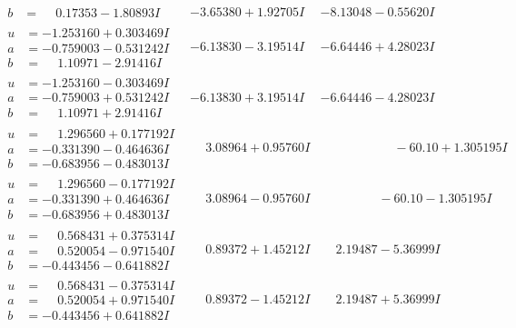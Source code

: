 \documentclass[1p]{elsarticle_modified}
\theoremstyle{definition}
\begin{document}
$$\begin{array}{c|c|c}
\begin{aligned}
b &= \phantom{-}0.17353 - 1.80893 I\end{aligned}
 & -3.65380 + 1.92705 I & -8.13048 - 0.55620 I \\ \hline\begin{aligned}
u &= -1.253160 + 0.303469 I \\
a &= -0.759003 - 0.531242 I \\
b &= \phantom{-}1.10971 - 2.91416 I\end{aligned}
 & -6.13830 - 3.19514 I & -6.64446 + 4.28023 I \\ \hline\begin{aligned}
u &= -1.253160 - 0.303469 I \\
a &= -0.759003 + 0.531242 I \\
b &= \phantom{-}1.10971 + 2.91416 I\end{aligned}
 & -6.13830 + 3.19514 I & -6.64446 - 4.28023 I \\ \hline\begin{aligned}
u &= \phantom{-}1.296560 + 0.177192 I \\
a &= -0.331390 - 0.464636 I \\
b &= -0.683956 - 0.483013 I\end{aligned}
 & \phantom{-}3.08964 + 0.95760 I & \phantom{-0.000000 -}     -6
0. 10   + 1.305195 I \\ \hline\begin{aligned}
u &= \phantom{-}1.296560 - 0.177192 I \\
a &= -0.331390 + 0.464636 I \\
b &= -0.683956 + 0.483013 I\end{aligned}
 & \phantom{-}3.08964 - 0.95760 I & \phantom{-0.000000 }      -6
0. 10   - 1.305195 I \\ \hline\begin{aligned}
u &= \phantom{-}0.568431 + 0.375314 I \\
a &= \phantom{-}0.520054 - 0.971540 I \\
b &= -0.443456 - 0.641882 I\end{aligned}
 & \phantom{-}0.89372 + 1.45212 I & \phantom{-}2.19487 - 5.36999 I \\ \hline\begin{aligned}
u &= \phantom{-}0.568431 - 0.375314 I \\
a &= \phantom{-}0.520054 + 0.971540 I \\
b &= -0.443456 + 0.641882 I\end{aligned}
 & \phantom{-}0.89372 - 1.45212 I & \phantom{-}2.19487 + 5.36999 I \\ \hline\begin{aligned}

\end{aligned}
\end{array}$$
\end{document}
